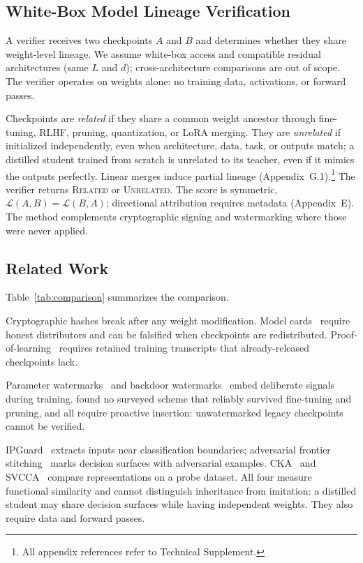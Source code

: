 \documentclass[letterpaper]{article}
\begin{document}
\subsection{White-Box Model Lineage Verification}

A verifier receives two checkpoints $A$ and $B$ and determines whether they share weight-level lineage. We assume white-box access and compatible residual architectures (same $L$ and $d$); cross-architecture comparisons are out of scope. The verifier operates on weights alone: no training data, activations, or forward passes.

Checkpoints are \emph{related} if they share a common weight ancestor through fine-tuning, RLHF, pruning, quantization, or LoRA merging. They are \emph{unrelated} if initialized independently, even when architecture, data, task, or outputs match; a distilled student trained from scratch is unrelated to its teacher, even if it mimics the outputs perfectly. Linear merges induce partial lineage (Appendix~G.1).\footnote{All appendix references refer to Technical Supplement.} The verifier returns \textsc{Related} or \textsc{Unrelated}. The score is symmetric, $\mathcal{L}(A,B) = \mathcal{L}(B,A)$; directional attribution requires metadata (Appendix~E). The method complements cryptographic signing and watermarking where those were never applied.

\subsection{Related Work}

Table~\ref{tab:comparison} summarizes the comparison.

Cryptographic hashes break after any weight modification. Model cards~\citep{mitchell2019model} require honest distributors and can be falsified when checkpoints are redistributed. Proof-of-learning~\citep{jia2021proofoflearning} requires retained training transcripts that already-released checkpoints lack.

Parameter watermarks~\citep{uchida2017embedding} and backdoor watermarks~\citep{adi2018turning} embed deliberate signals during training. \citet{lukas2022sok} found no surveyed scheme that reliably survived fine-tuning and pruning, and all require proactive insertion: unwatermarked legacy checkpoints cannot be verified.

IPGuard~\citep{cao2021ipguard} extracts inputs near classification boundaries; adversarial frontier stitching~\citep{lemerrer2020adversarial} marks decision surfaces with adversarial examples. CKA~\citep{kornblith2019similarity} and SVCCA~\citep{raghu2017svcca} compare representations on a probe dataset. All four measure functional similarity and cannot distinguish inheritance from imitation: a distilled student may share decision surfaces while having independent weights. They also require data and forward passes.
\end{document}
